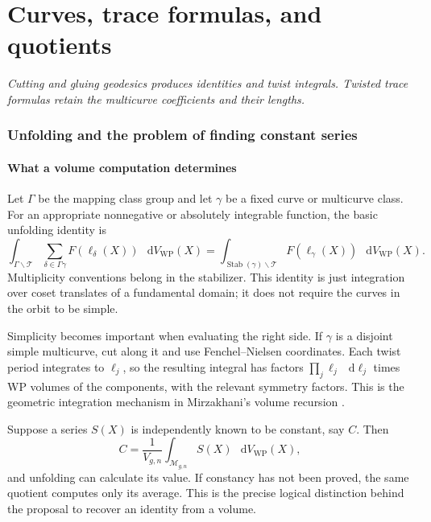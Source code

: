 \documentclass[11pt,a4paper]{article}
\newcommand{\monographpart}[2]{%
  \clearpage\part{#1}%
  \noindent\textit{#2}\par\medskip}
\numberwithin{equation}{section}
\theoremstyle{definition}
\theoremstyle{remark}
\DeclareMathOperator{\Stab}{Stab}
\newcommand{\dd}{\mathop{}\!\mathrm d}
\newcommand{\WP}{\mathrm{WP}}
\newcommand{\M}{\mathcal M}
\newcommand{\T}{\mathcal T}
\newcommand{\dV}{\dd V_{\WP}}
\begin{document}
\monographpart{Curves, trace formulas, and quotients}{Cutting and gluing geodesics produces identities and twist integrals. Twisted trace formulas retain the multicurve coefficients and their lengths.}

\section{Unfolding and the problem of finding constant series}
\label{sec:unfolding}

\subsection{What a volume computation determines}

Let $\Gamma$ be the mapping class group and let $\gamma$ be a fixed curve
or multicurve class. For an appropriate nonnegative or absolutely integrable
function, the basic unfolding identity is
\begin{equation}
 \int_{\Gamma\backslash\T}
 \sum_{\delta\in\Gamma\gamma}F(\ell_\delta(X))\,\dV(X)
 =\int_{\Stab(\gamma)\backslash\T}
             F(\ell_\gamma(X))\,\dV(X).
 \label{eq:unfold}
\end{equation}
Multiplicity conventions belong in the stabilizer. This identity is just
integration over coset translates of a fundamental domain; it does not
require the curves in the orbit to be simple.

Simplicity becomes important when evaluating the right side. If $\gamma$
is a disjoint simple multicurve, cut along it and use Fenchel--Nielsen
coordinates. Each twist period integrates to $\ell_j$, so the resulting
integral has factors $\prod_j\ell_j\,\dd\ell_j$ times WP volumes of the
components, with the relevant symmetry factors. This is the geometric
integration mechanism in Mirzakhani's volume recursion
\cite[Theorem 8.1]{MirzVolumes}.

Suppose a series $S(X)$ is independently known to be constant, say $C$.
Then
\begin{equation}
 C=\frac{1}{V_{g,n}}
       \int_{\M_{g,n}}S(X)\,\dV(X),
 \label{eq:recoverconstant}
\end{equation}
and unfolding can calculate its value. If constancy has not been proved,
the same quotient computes only its average. This is the precise logical
distinction behind the proposal to recover an identity from a volume.
\end{document}
